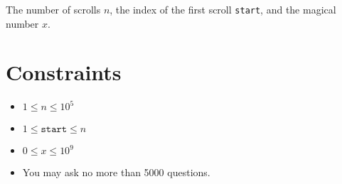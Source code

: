 The number of scrolls $n$, the index of the first scroll \texttt{start}, and the magical number $x$.

\section*{Constraints}

\begin{itemize}
    \item $1 \leq n \leq 10^5$
    \item $1 \leq \texttt{start} \leq n$
    \item $0 \leq x \leq 10^9$
    \item You may ask no more than 5000 questions.
\end{itemize}